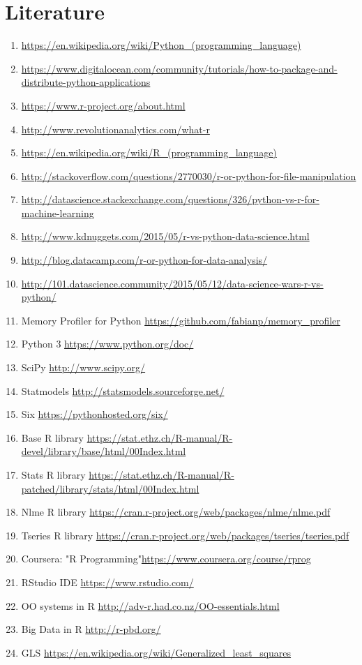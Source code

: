 \documentclass [twoside,
  11pt, a4paper,
  footinclude=true,
  headinclude=true,
  cleardoublepage=empty
]{article}
\begin{document}
\section{Literature}
\begin{enumerate}
    \item \url{https://en.wikipedia.org/wiki/Python_(programming_language)}
    \item \url{https://www.digitalocean.com/community/tutorials/how-to-package-and-distribute-python-applications}
    \item \url{https://www.r-project.org/about.html}
    \item \url{http://www.revolutionanalytics.com/what-r}
    \item \url{https://en.wikipedia.org/wiki/R_(programming_language)}
    \item \url{http://stackoverflow.com/questions/2770030/r-or-python-for-file-manipulation}
    \item \url{http://datascience.stackexchange.com/questions/326/python-vs-r-for-machine-learning}
    \item \url{http://www.kdnuggets.com/2015/05/r-vs-python-data-science.html}
    \item \url{http://blog.datacamp.com/r-or-python-for-data-analysis/}
    \item \url{http://101.datascience.community/2015/05/12/data-science-wars-r-vs-python/}
    \item Memory Profiler for Python \url{https://github.com/fabianp/memory_profiler} 
    \item Python 3 \url{https://www.python.org/doc/}
    \item SciPy \url{http://www.scipy.org/}
    \item Statmodels \url{http://statsmodels.sourceforge.net/}
    \item Six \url{https://pythonhosted.org/six/}
    \item Base R library \url{https://stat.ethz.ch/R-manual/R-devel/library/base/html/00Index.html}
    \item Stats R library \url{https://stat.ethz.ch/R-manual/R-patched/library/stats/html/00Index.html}
    \item Nlme R library \url{https://cran.r-project.org/web/packages/nlme/nlme.pdf}
    \item Tseries R library \url{https://cran.r-project.org/web/packages/tseries/tseries.pdf}
    \item Coursera: "R Programming"\url{https://www.coursera.org/course/rprog}
    \item RStudio IDE \url{https://www.rstudio.com/}
    \item OO systems in R \url{http://adv-r.had.co.nz/OO-essentials.html}
    \item Big Data in R \url{http://r-pbd.org/}
    \item GLS \url{https://en.wikipedia.org/wiki/Generalized_least_squares}
\end{enumerate}
\end{document}

